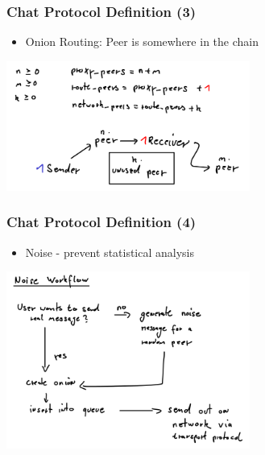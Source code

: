 \documentclass{beamer}
\begin{document}
\frame
{
  \frametitle{Chat Protocol Definition (3)}
  \begin{itemize}
      \item Onion Routing: Peer is somewhere in the chain
   \end{itemize}
  \begin{center}
   \includegraphics[width=8cm]{../onionrouting.png}
  \end{center}
}

\frame
{
  \frametitle{Chat Protocol Definition (4)}
  \begin{itemize}
      \item Noise - prevent statistical analysis
   \end{itemize}
  \begin{center}
   \includegraphics[width=8cm]{../noiseworkflow.png}
  \end{center}
}

\end{document}
